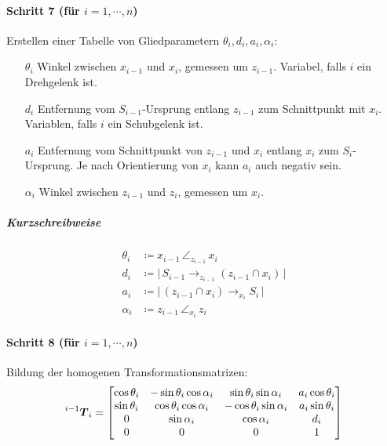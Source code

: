 \documentclass[a4paper, 11pt, accentcolor = tud3b]{tudreport}
\newcommand{\inreferenceto}[2]{\prescript{#1}{}{#2}}
\newcommand{\mat}[1]{\boldsymbol{#1}}
\begin{document}
					\paragraph{Schritt 7 (für \( i = 1, \cdots, n \))}
						Erstellen einer Tabelle von Gliedparametern \( \theta_i, d_i, a_i, \alpha_i \):
						\begin{itemize}
							\item[\(\theta_i\)] Winkel zwischen \(x_{i - 1}\) und \(x_i\), gemessen um \(z_{i - 1}\). Variabel, falls \(i\) ein Drehgelenk ist.
							\item[\(d_i\)] Entfernung vom \(S_{i - 1}\)-Ursprung entlang \(z_{i - 1}\) zum Schnittpunkt mit \(x_i\). Variablen, falls \(i\) ein Schubgelenk ist.
							\item[\(a_i\)] Entfernung vom Schnittpunkt von \(z_{i - 1}\) und \(x_i\) entlang \(x_i\) zum \(S_i\)-Ursprung. Je nach Orientierung von \(x_i\) kann \(a_i\) auch negativ sein.
							\item[\(\alpha_i\)] Winkel zwischen \( z_{i - 1} \) und \(z_i\), gemessen um \(x_i\).
						\end{itemize}
					
						\subparagraph{Kurzschreibweise}
						\begin{align*}
							\theta_i & \coloneqq x_{i - 1} \,\angle_{z_{i - 1}}\, x_i                                     \\
							d_i      & \coloneqq \big\lvert\, S_{i - 1} \to_{z_{i - 1}} (z_{i - 1} \cap x_i) \,\big\rvert \\
							a_i      & \coloneqq \big\lvert\, (z_{i - 1} \cap x_i) \to_{x_i} S_i \,\big\rvert                   \\
							\alpha_i & \coloneqq z_{i - 1} \,\angle_{x_i}\, z_i
						\end{align*}
					
					\paragraph{Schritt 8 (für \( i = 1, \cdots, n \))}
						Bildung der homogenen Transformationsmatrizen:
						\begin{equation*}
							\inreferenceto{i - 1}{\mat{T}}_i =
								\begin{bmatrix}
									\cos\theta_i & -\sin\theta_i \cos\alpha_i & \sin\theta_i \sin\alpha_i  & a_i \cos\theta_i \\
									\sin\theta_i & \cos\theta_i \cos\alpha_i  & -\cos\theta_i \sin\alpha_i & a_i \sin\theta_i \\
									0            & \sin\alpha_i               & \cos\alpha_i               & d_i              \\
									0            & 0                          & 0                          & 1
								\end{bmatrix}
						\end{equation*}
					
\end{document}
